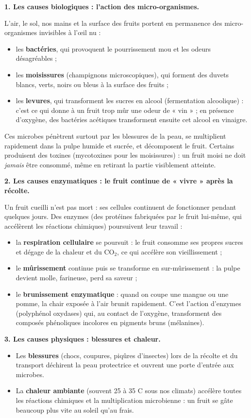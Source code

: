\documentclass[11pt]{article}
\newcommand{\cle}[1]{{\popxbold\color{popdark}#1}}
\begin{document}
\textbf{1. Les causes biologiques : l'action des micro-organismes.}\par
L'air, le sol, nos mains et la surface des fruits portent en permanence des \cle{micro-organismes} invisibles à l'œil nu :
\begin{itemize}
\item les \textbf{bactéries}, qui provoquent le pourrissement mou et les odeurs désagréables ;
\item les \textbf{moisissures} (champignons microscopiques), qui forment des duvets blancs, verts, noirs ou bleus à la surface des fruits ;
\item les \textbf{levures}, qui transforment les sucres en alcool (fermentation alcoolique) : c'est ce qui donne à un fruit trop mûr une odeur de « vin » ; en présence d'oxygène, des bactéries acétiques transforment ensuite cet alcool en vinaigre.
\end{itemize}
Ces microbes pénètrent surtout par les blessures de la peau, se multiplient rapidement dans la pulpe humide et sucrée, et décomposent le fruit. Certains produisent des toxines (mycotoxines pour les moisissures) : un fruit moisi ne doit \emph{jamais} être consommé, même en retirant la partie visiblement atteinte.

\textbf{2. Les causes enzymatiques : le fruit continue de « vivre » après la récolte.}\par
Un fruit cueilli n'est pas mort : ses cellules continuent de fonctionner pendant quelques jours. Des \cle{enzymes} (des protéines fabriquées par le fruit lui-même, qui accélèrent les réactions chimiques) poursuivent leur travail :
\begin{itemize}
\item la \textbf{respiration cellulaire} se poursuit : le fruit consomme ses propres sucres et dégage de la chaleur et du CO$_2$, ce qui accélère son vieillissement ;
\item le \textbf{mûrissement} continue puis se transforme en sur-mûrissement : la pulpe devient molle, farineuse, perd sa saveur ;
\item le \textbf{brunissement enzymatique} : quand on coupe une mangue ou une pomme, la chair exposée à l'air brunit rapidement. C'est l'action d'enzymes (polyphénol oxydases) qui, au contact de l'oxygène, transforment des composés phénoliques incolores en pigments bruns (mélanines).
\end{itemize}

\textbf{3. Les causes physiques : blessures et chaleur.}\par
\begin{itemize}
\item Les \textbf{blessures} (chocs, coupures, piqûres d'insectes) lors de la récolte et du transport déchirent la peau protectrice et ouvrent une porte d'entrée aux microbes.
\item La \textbf{chaleur ambiante} (souvent 25 à 35 \textdegree C sous nos climats) accélère toutes les réactions chimiques et la multiplication microbienne : un fruit se gâte beaucoup plus vite au soleil qu'au frais.
\end{itemize}
\end{document}
